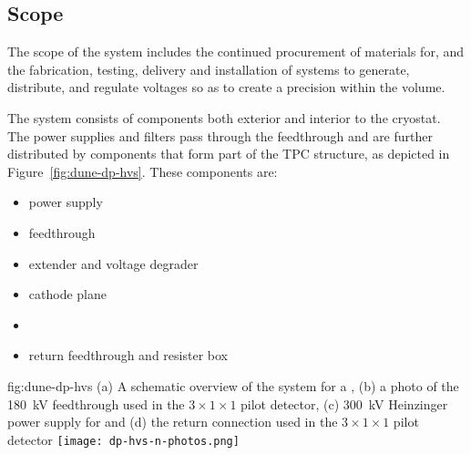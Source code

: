 \subsection{Scope}
\label{sec:fddp-hv-scope}
The scope of the  system %
includes the continued procurement of materials for, and the fabrication, testing, delivery and installation of systems to generate, distribute, and regulate voltages so as to create a precision \efield within the \detmodule volume. 


The \hv system consists of components both exterior and interior to the cryostat. The \hv power supplies and filters pass through the \hv feedthrough and are further distributed by components that form part of the TPC structure, as depicted in Figure~\ref{fig:dune-dp-hvs}. These components are:


\begin{itemize}
\item power supply
\item {} feedthrough
\item \hv extender and voltage degrader
\item cathode plane
\item \fcage
\item \hv return feedthrough and resister box
\end{itemize}

\begin{dunefigure}%
{fig:dune-dp-hvs}
{
(a) A schematic overview of the \hv system for a \dpmod{}, %
(b) a photo of the \SI{180}{\kV} feedthrough used in the $3\times 1\times 1$ pilot \dual detector, (c) \SI{300}{\kV} Heinzinger power supply for  and (d) the \hv return connection used in the $3\times 1 \times 1$ pilot \dual detector}
\texttt{[image: dp-hvs-n-photos.png]}
\end{dunefigure}


